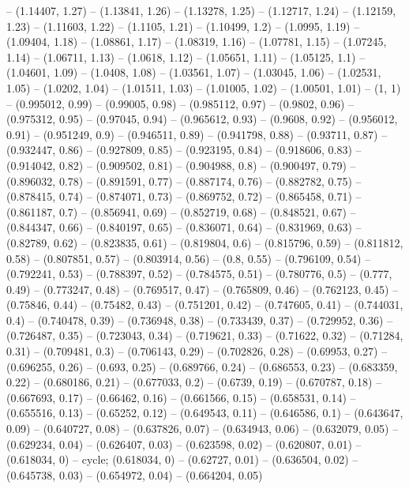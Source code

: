 -- (1.14407, 1.27)
-- (1.13841, 1.26)
-- (1.13278, 1.25)
-- (1.12717, 1.24)
-- (1.12159, 1.23)
-- (1.11603, 1.22)
-- (1.1105, 1.21)
-- (1.10499, 1.2)
-- (1.0995, 1.19)
-- (1.09404, 1.18)
-- (1.08861, 1.17)
-- (1.08319, 1.16)
-- (1.07781, 1.15)
-- (1.07245, 1.14)
-- (1.06711, 1.13)
-- (1.0618, 1.12)
-- (1.05651, 1.11)
-- (1.05125, 1.1)
-- (1.04601, 1.09)
-- (1.0408, 1.08)
-- (1.03561, 1.07)
-- (1.03045, 1.06)
-- (1.02531, 1.05)
-- (1.0202, 1.04)
-- (1.01511, 1.03)
-- (1.01005, 1.02)
-- (1.00501, 1.01)
-- (1, 1)
-- (0.995012, 0.99)
-- (0.99005, 0.98)
-- (0.985112, 0.97)
-- (0.9802, 0.96)
-- (0.975312, 0.95)
-- (0.97045, 0.94)
-- (0.965612, 0.93)
-- (0.9608, 0.92)
-- (0.956012, 0.91)
-- (0.951249, 0.9)
-- (0.946511, 0.89)
-- (0.941798, 0.88)
-- (0.93711, 0.87)
-- (0.932447, 0.86)
-- (0.927809, 0.85)
-- (0.923195, 0.84)
-- (0.918606, 0.83)
-- (0.914042, 0.82)
-- (0.909502, 0.81)
-- (0.904988, 0.8)
-- (0.900497, 0.79)
-- (0.896032, 0.78)
-- (0.891591, 0.77)
-- (0.887174, 0.76)
-- (0.882782, 0.75)
-- (0.878415, 0.74)
-- (0.874071, 0.73)
-- (0.869752, 0.72)
-- (0.865458, 0.71)
-- (0.861187, 0.7)
-- (0.856941, 0.69)
-- (0.852719, 0.68)
-- (0.848521, 0.67)
-- (0.844347, 0.66)
-- (0.840197, 0.65)
-- (0.836071, 0.64)
-- (0.831969, 0.63)
-- (0.82789, 0.62)
-- (0.823835, 0.61)
-- (0.819804, 0.6)
-- (0.815796, 0.59)
-- (0.811812, 0.58)
-- (0.807851, 0.57)
-- (0.803914, 0.56)
-- (0.8, 0.55)
-- (0.796109, 0.54)
-- (0.792241, 0.53)
-- (0.788397, 0.52)
-- (0.784575, 0.51)
-- (0.780776, 0.5)
-- (0.777, 0.49)
-- (0.773247, 0.48)
-- (0.769517, 0.47)
-- (0.765809, 0.46)
-- (0.762123, 0.45)
-- (0.75846, 0.44)
-- (0.75482, 0.43)
-- (0.751201, 0.42)
-- (0.747605, 0.41)
-- (0.744031, 0.4)
-- (0.740478, 0.39)
-- (0.736948, 0.38)
-- (0.733439, 0.37)
-- (0.729952, 0.36)
-- (0.726487, 0.35)
-- (0.723043, 0.34)
-- (0.719621, 0.33)
-- (0.71622, 0.32)
-- (0.71284, 0.31)
-- (0.709481, 0.3)
-- (0.706143, 0.29)
-- (0.702826, 0.28)
-- (0.69953, 0.27)
-- (0.696255, 0.26)
-- (0.693, 0.25)
-- (0.689766, 0.24)
-- (0.686553, 0.23)
-- (0.683359, 0.22)
-- (0.680186, 0.21)
-- (0.677033, 0.2)
-- (0.6739, 0.19)
-- (0.670787, 0.18)
-- (0.667693, 0.17)
-- (0.66462, 0.16)
-- (0.661566, 0.15)
-- (0.658531, 0.14)
-- (0.655516, 0.13)
-- (0.65252, 0.12)
-- (0.649543, 0.11)
-- (0.646586, 0.1)
-- (0.643647, 0.09)
-- (0.640727, 0.08)
-- (0.637826, 0.07)
-- (0.634943, 0.06)
-- (0.632079, 0.05)
-- (0.629234, 0.04)
-- (0.626407, 0.03)
-- (0.623598, 0.02)
-- (0.620807, 0.01)
-- (0.618034, 0)
-- cycle;
\drawBand (0.618034, 0)
-- (0.62727, 0.01)
-- (0.636504, 0.02)
-- (0.645738, 0.03)
-- (0.654972, 0.04)
-- (0.664204, 0.05)

